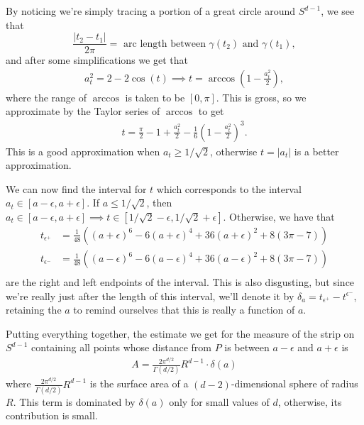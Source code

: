 \begin{homework}[e]
\begin{soln}
    By noticing we're simply tracing a portion of a great circle around $S^{d-1}$, we see that
    \begin{equation}\label{eqn:dist-on-great-arc}
      \frac{|t_2 - t_1|}{2\pi} = \text{ arc length between $\gamma(t_2)$ and $\gamma(t_1)$},
    \end{equation}
    and after some simplifications we get that
    \begin{align*}
      a_t^2 = 2 - 2\cos(t) \implies t = \arccos\left(1 - \frac{a_t^2}{2}\right),
    \end{align*}
    where the range of $\arccos$ is taken to be $[0,\pi]$. This is gross, so we approximate by the Taylor series of $\arccos$ to get
    \begin{align*}
      t = \frac{\pi}{2} - 1 + \frac{a_t^2}{2} - \frac{1}{6}\left(1 - \frac{a_t^2}{2}\right)^3.
    \end{align*}
    This is a good approximation when $a_t \geq 1/\sqrt{2}$, otherwise $t = |a_t|$ is a better approximation.

    We can now find the interval for $t$ which corresponds to the interval $a_t \in [a-\epsilon,a+\epsilon]$. If $a \leq 1/\sqrt{2}$, then $a_t \in [a-\epsilon,a+\epsilon]\implies t\in [1/\sqrt{2}-\epsilon, 1/\sqrt{2} + \epsilon]$. Otherwise, we have that
    \begin{align*}
      t_{\epsilon^+} &= \frac{1}{48}\left((a + \epsilon)^6 - 6(a + \epsilon)^4 + 36(a + \epsilon)^2+8(3\pi - 7)\right) \\
      t_{\epsilon^-} &= \frac{1}{48}\left((a - \epsilon)^6 - 6(a - \epsilon)^4 + 36(a - \epsilon)^2+8(3\pi - 7)\right) \\
    \end{align*}
    are the right and left endpoints of the interval. This is also disgusting, but since we're really just after the length of this interval, we'll denote it by $\delta_a = t_{\epsilon^+} - t^{\epsilon^-}$, retaining the $a$ to remind ourselves that this is really a function of $a$.
    
    \bigskip

    Putting everything together, the estimate we get for the measure of the strip on $S^{d-1}$ containing all points whose distance from $P$ is between $a - \epsilon$ and $a + \epsilon$ is
    \begin{align*}
      A = \frac{2\pi^{d/2}}{\Gamma(d/2)}R^{d-1}\cdot \delta(a)
    \end{align*}
    where $\frac{2\pi^{d/2}}{\Gamma(d/2)}R^{d-1}$ is the surface area of a $(d-2)$-dimensional sphere of radius $R$. This term is dominated by $\delta(a)$ only for small values of $d$, otherwise, its contribution is small.


\end{soln}
\end{homework}
